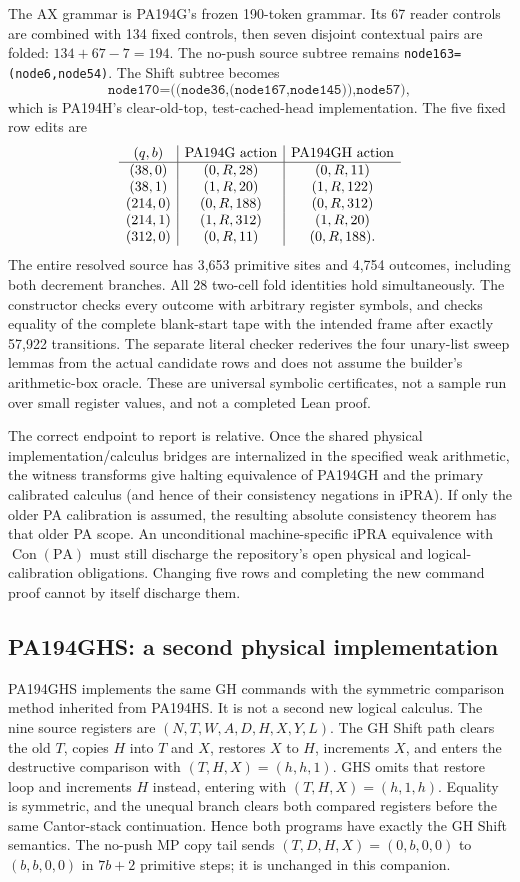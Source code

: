 The AX grammar is PA194G's frozen 190-token grammar. Its 67 reader controls
are combined with 134 fixed controls, then seven disjoint contextual pairs
are folded: $134+67-7=194$. The no-push source subtree remains
\texttt{node163=(node6,node54)}. The Shift subtree becomes
\[
 \texttt{node170=((node36,(node167,node145)),node57)},
\]
which is PA194H's clear-old-top, test-cached-head implementation.
The five fixed row edits are
\[
\begin{array}{c|c|c}
(q,b)&\hbox{PA194G action}&\hbox{PA194GH action}\\\hline
(38,0)&(0,R,28)&(0,R,11)\\
(38,1)&(1,R,20)&(1,R,122)\\
(214,0)&(0,R,188)&(0,R,312)\\
(214,1)&(1,R,312)&(1,R,20)\\
(312,0)&(0,R,11)&(0,R,188).
\end{array}
\]
The entire resolved source has 3,653 primitive sites and 4,754 outcomes,
including both decrement branches. All 28 two-cell fold identities hold
simultaneously. The constructor checks every outcome with arbitrary
register symbols, and checks equality of the complete blank-start tape
with the intended frame after exactly 57,922 transitions. The separate
literal checker rederives the four unary-list sweep lemmas from the
actual candidate rows and does not assume the builder's arithmetic-box
oracle. These are universal symbolic certificates, not a sample run over
small register values, and not a completed Lean proof.

The correct endpoint to report is relative. Once the shared physical
implementation/calculus bridges are internalized in the specified weak
arithmetic, the witness transforms give halting equivalence of PA194GH
and the primary calibrated calculus (and hence of their consistency
negations in iPRA). If only the older PA calibration is assumed, the
resulting absolute consistency theorem has that older PA scope.
An unconditional machine-specific iPRA equivalence with
$\operatorname{Con}(\mathrm{PA})$ must still discharge the repository's
open physical and logical-calibration obligations. Changing five rows
and completing the new command proof cannot by itself discharge them.

\subsection{PA194GHS: a second physical implementation}

PA194GHS implements the same GH commands with the symmetric comparison
method inherited from PA194HS. It is not a second new logical calculus.
The nine source registers are $(N,T,W,A,D,H,X,Y,L)$. The GH Shift path
clears the old $T$, copies $H$ into $T$ and $X$, restores $X$ to $H$,
increments $X$, and enters the destructive comparison with
$(T,H,X)=(h,h,1)$. GHS omits that restore loop and increments $H$ instead,
entering with $(T,H,X)=(h,1,h)$. Equality is symmetric, and the unequal
branch clears both compared registers before the same Cantor-stack
continuation. Hence both programs have exactly the GH Shift semantics.
The no-push MP copy tail sends $(T,D,H,X)=(0,b,0,0)$ to $(b,b,0,0)$
in $7b+2$ primitive steps; it is unchanged in this companion.

